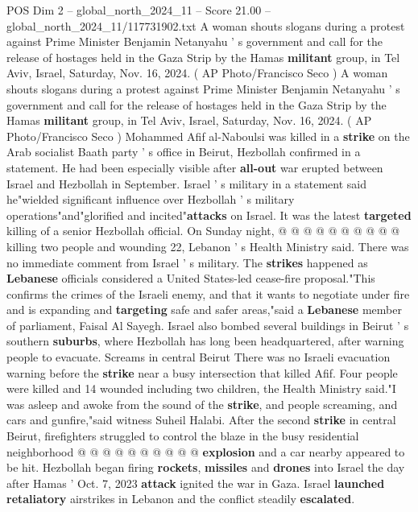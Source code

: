 \begin{textsample}{POS Dim 2 – global\_north\_2024\_11 – Score 21.00 – global\_north\_2024\_11/117731902.txt}  \label{ex:f2_pos_258}
A woman shouts slogans during a protest against Prime Minister Benjamin Netanyahu ' s government and call for the release of hostages held in the Gaza Strip by the Hamas \textbf{militant} group, in Tel Aviv, Israel, Saturday, Nov. 16, 2024. ( AP Photo/Francisco Seco ) A woman shouts slogans during a protest against Prime Minister Benjamin Netanyahu ' s government and call for the release of hostages held in the Gaza Strip by the Hamas \textbf{militant} group, in Tel Aviv, Israel, Saturday, Nov. 16, 2024. ( AP Photo/Francisco Seco ) Mohammed Afif al-Naboulsi was killed in a \textbf{strike} on the Arab socialist Baath party ' s office in Beirut, Hezbollah confirmed in a statement.
He had been especially visible after \textbf{all-out} war erupted between Israel and Hezbollah in September.
Israel ' s military in a statement said he"wielded significant influence over Hezbollah ' s military operations"and"glorified and incited"\textbf{attacks} on Israel.
It was the latest \textbf{targeted} killing of a senior Hezbollah official.
On Sunday night, @ @ @ @ @ @ @ @ @ @ killing two people and wounding 22, Lebanon ' s Health Ministry said.
There was no immediate comment from Israel ' s military.
The \textbf{strikes} happened as \textbf{Lebanese} officials considered a United States-led cease-fire proposal."This confirms the crimes of the Israeli enemy, and that it wants to negotiate under fire and is expanding and \textbf{targeting} safe and safer areas,"said a \textbf{Lebanese} member of parliament, Faisal Al Sayegh.
Israel also bombed several buildings in Beirut ' s southern \textbf{suburbs}, where Hezbollah has long been headquartered, after warning people to evacuate.
Screams in central Beirut There was no Israeli evacuation warning before the \textbf{strike} near a busy intersection that killed Afif.
Four people were killed and 14 wounded including two children, the Health Ministry said."I was asleep and awoke from the sound of the \textbf{strike}, and people screaming, and cars and gunfire,"said witness Suheil Halabi.
After the second \textbf{strike} in central Beirut, firefighters struggled to control the blaze in the busy residential neighborhood @ @ @ @ @ @ @ @ @ @ \textbf{explosion} and a car nearby appeared to be hit.
Hezbollah began firing \textbf{rockets}, \textbf{missiles} and \textbf{drones} into Israel the day after Hamas ' Oct. 7, 2023 \textbf{attack} ignited the war in Gaza.
Israel \textbf{launched} \textbf{retaliatory} airstrikes in Lebanon and the conflict steadily \textbf{escalated}.

\end{textsample}
